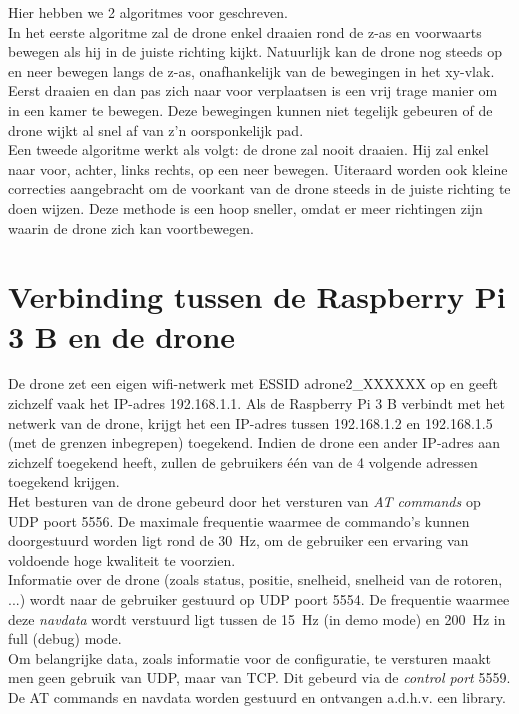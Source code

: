 Hier hebben we 2 algoritmes voor geschreven.\\
In het eerste algoritme zal de drone enkel draaien rond de z-as en voorwaarts bewegen als hij in de juiste richting kijkt. Natuurlijk kan de drone nog steeds op en neer bewegen langs de z-as, onafhankelijk van de bewegingen in het xy-vlak. Eerst draaien en dan pas zich naar voor verplaatsen is een vrij trage manier om in een kamer te bewegen. Deze bewegingen kunnen niet tegelijk gebeuren of de drone wijkt al snel af van z'n oorsponkelijk pad.\\
Een tweede algoritme werkt als volgt: de drone zal nooit draaien. Hij zal enkel naar voor, achter, links rechts, op een neer bewegen. Uiteraard worden ook kleine correcties aangebracht om de voorkant van de drone steeds in de juiste richting te doen wijzen. Deze methode is een hoop sneller, omdat er meer richtingen zijn waarin de drone zich kan voortbewegen.

\section{Verbinding tussen de Raspberry Pi 3 B en de drone} \label{sec:raspberry_drone}
De drone zet een eigen wifi-netwerk met ESSID adrone2\_XXXXXX  op en geeft zichzelf vaak het IP-adres 192.168.1.1.
Als de Raspberry Pi 3 B verbindt met het netwerk van de drone, krijgt het een IP-adres tussen 192.168.1.2 en 192.168.1.5 (met de grenzen inbegrepen) toegekend.
Indien de drone een ander IP-adres aan zichzelf toegekend heeft, zullen de gebruikers één van de 4 volgende adressen toegekend krijgen.\\
Het besturen van de drone gebeurd door het versturen van \textit{AT commands} op UDP poort 5556.
De maximale frequentie waarmee de commando's kunnen doorgestuurd worden ligt rond de \SI{30}{\Hz}, om de gebruiker een ervaring van voldoende hoge kwaliteit te voorzien.\\

Informatie over de drone (zoals status, positie, snelheid, snelheid van de rotoren, ...) wordt naar de gebruiker gestuurd op UDP poort 5554.
De frequentie waarmee deze \textit{navdata} wordt verstuurd ligt tussen de \SI{15}{\Hz} (in demo mode) en \SI{200}{\Hz} in full (debug) mode.\\
Om belangrijke data, zoals informatie voor de configuratie, te versturen maakt men geen gebruik van UDP, maar van TCP.
Dit gebeurd via de \textit{control port} 5559. \cite{developer_guide2012}\\
De AT commands en navdata worden gestuurd en ontvangen a.d.h.v. een library.\\

